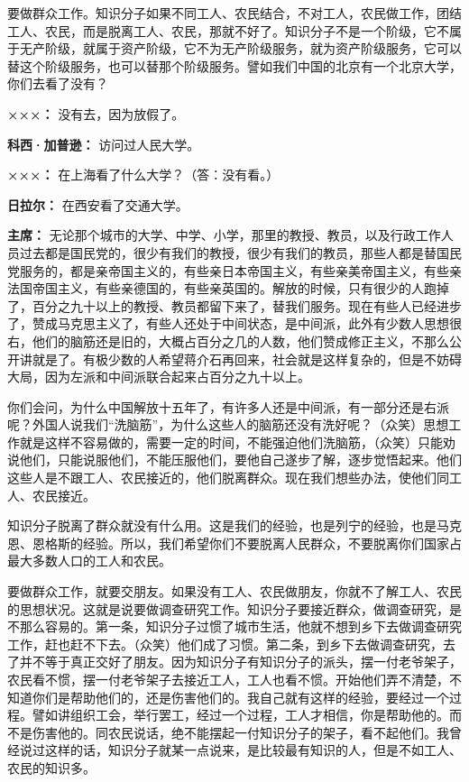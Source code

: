 \begin{duihua}
要做群众工作。知识分子如果不同工人、农民结合，不对工人，农民做工作，团结工人、农民，而是脱离工人、农民，那就不好了。知识分子不是一个阶级，它不属于无产阶级，就属于资产阶级，它不为无产阶级服务，就为资产阶级服务，它可以替这个阶级服务，也可以替那个阶级服务。譬如我们中国的北京有一个北京大学，你们去看了没有？

\item[\textbf{×××：}] 没有去，因为放假了。

\item[\textbf{科西·加普逊：}] 访问过人民大学。

\item[\textbf{×××：}] 在上海看了什么大学？（答：没有看。）

\item[\textbf{日拉尔：}] 在西安看了交通大学。

\item[\textbf{主席：}] 无论那个城市的大学、中学、小学，那里的教授、教员，以及行政工作人员过去都是国民党的，很少有我们的教授，很少有我们的教员，那些人都是替国民党服务的，都是亲帝国主义的，有些亲日本帝国主义，有些亲美帝国主义，有些亲法国帝国主义，有些亲德国的，有些亲英国的。解放的时候，只有很少的人跑掉了，百分之九十以上的教授、教员都留下来了，替我们服务。现在有些人已经进步了，赞成马克思主义了，有些人还处于中间状态，是中间派，此外有少数人思想很右，他们的脑筋还是旧的，大概占百分之几的人数，他们赞成修正主义，不那么公开讲就是了。有极少数的人希望蒋介石再回来，社会就是这样复杂的，但是不妨碍大局，因为左派和中间派联合起来占百分之九十以上。

你们会问，为什么中国解放十五年了，有许多人还是中间派，有一部分还是右派呢？外国人说我们“洗脑筋”，为什么这些人的脑筋还没有洗好呢？（众笑）思想工作就是这样不容易做的，需要一定的时间，不能强迫他们洗脑筋，（众笑）只能劝说他们，只能说服他们，不能压服他们，要他自己遂步了解，逐步觉悟起来。他们这些人是不跟工人、农民接近的，他们脱离群众。现在我们想些办法，使他们同工人、农民接近。

知识分子脱离了群众就没有什么用。这是我们的经验，也是列宁的经验，也是马克恩、恩格斯的经验。所以，我们希望你们不要脱离人民群众，不要脱离你们国家占最大多数人口的工人和农民。

要做群众工作，就要交朋友。如果没有工人、农民做朋友，你就不了解工人、农民的思想状况。这就是说要做调查研究工作。知识分子要接近群众，做调查研究，是不那么容易的。第一条，知识分子过惯了城市生活，他就不想到乡下去做调查研究工作，赶也赶不下去。（众笑）他们成了习惯。第二条，到乡下去做调查研究，去了并不等于真正交好了朋友。因为知识分子有知识分子的派头，摆一付老爷架子，农民看不惯，摆一付老爷架子去接近工人，工人也看不惯。开始他们弄不清楚，不知道你们是帮助他们的，还是伤害他们的。我自己就有这样的经验，要经过一个过程。譬如讲组织工会，举行罢工，经过一个过程，工人才相信，你是帮助他的。而不是伤害他的。同农民说话，绝不能摆起一付知识分子的架子，看不起他们。我曾经说过这样的话，知识分子就某一点说来，是比较最有知识的人，但是不如工人、农民的知识多。


\end{duihua}
